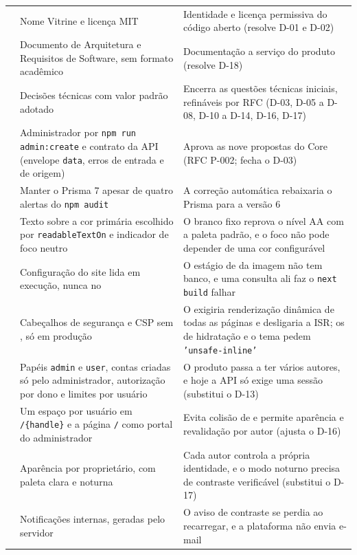 \begin{longtable}{@{}L{2.0cm}L{5.6cm}L{6.4cm}@{}}
 & Nome Vitrine e licença MIT & Identidade e licença permissiva do código aberto (resolve D-01 e D-02)\\
 & Documento de Arquitetura e Requisitos de Software, sem formato acadêmico & Documentação a serviço do produto (resolve D-18)\\
 & Decisões técnicas com valor padrão adotado & Encerra as questões técnicas iniciais, refináveis por RFC (D-03, D-05 a D-08, D-10 a D-14, D-16, D-17)\\
 & Administrador por \texttt{npm run admin:create} e contrato da API (envelope \texttt{data}, erros de entrada e de origem) & Aprova as nove propostas do Core (RFC P-002; fecha o D-03)\\
 & Manter o Prisma 7 apesar de quatro alertas do \texttt{npm audit} & A correção automática rebaixaria o Prisma para a versão 6\\
 & Texto sobre a cor primária escolhido por \texttt{readableTextOn} e indicador de foco neutro & O branco fixo reprova o nível AA com a paleta padrão, e o foco não pode depender de uma cor configurável\\
 & Configuração do site lida em execução, nunca no  & O estágio de  da imagem não tem banco, e uma consulta ali faz o \texttt{next build} falhar\\
 & Cabeçalhos de segurança e CSP sem , só em produção & O  exigiria renderização dinâmica de todas as páginas e desligaria a ISR; os  de hidratação e o tema pedem \texttt{'unsafe-inline'}\\
 & Papéis \texttt{admin} e \texttt{user}, contas criadas só pelo administrador, autorização por dono e limites por usuário & O produto passa a ter vários autores, e hoje a API só exige uma sessão (substitui o D-13)\\
 & Um espaço por usuário em \texttt{/\{handle\}} e a página \texttt{/} como portal do administrador & Evita colisão de  e permite aparência e revalidação por autor (ajusta o D-16)\\
 & Aparência por proprietário, com paleta clara e noturna & Cada autor controla a própria identidade, e o modo noturno precisa de contraste verificável (substitui o D-17)\\
 & Notificações internas, geradas pelo servidor & O aviso de contraste se perdia ao recarregar, e a plataforma não envia e-mail\\

\end{longtable}
